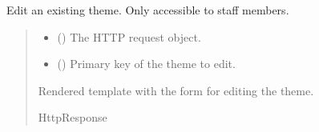 \documentclass[letterpaper,10pt,english]{sphinxmanual}
\begin{document}
\begin{fulllineitems}
\label{\detokenize{courses:courses.views.edit_theme}}
\pysigstartsignatures
\pysiglinewithargsret
{}
{\sphinxparamcomma {}}
{}
\pysigstopsignatures
\sphinxAtStartPar
Edit an existing theme. Only accessible to staff members.
\begin{quote}\begin{description}
\begin{itemize}
\item {} 
\sphinxAtStartPar
{} () \textendash{} The HTTP request object.

\item {} 
\sphinxAtStartPar
{} () \textendash{} Primary key of the theme to edit.

\end{itemize}

\sphinxAtStartPar
Rendered template with the form for editing the theme.

\sphinxAtStartPar
HttpResponse

\end{description}\end{quote}

\end{fulllineitems}


\begin{fulllineitems}
\label{\detokenize{courses:courses.views.import_data}}
\pysigstartsignatures
\pysiglinewithargsret
{}
{}
{}
\pysigstopsignatures
\end{fulllineitems}

\end{document}
